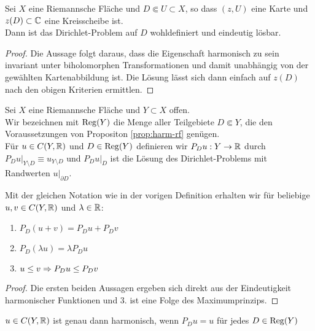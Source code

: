 \begin{prop}
  \label{prop:harm-rf}
  Sei $X$ eine Riemannsche Fläche und $D \Subset U \subset X$, so dass
  $(z, U)$ eine Karte und $z(D) \subset \mathbb{C}$ eine Kreisscheibe ist. \\
  Dann ist das Dirichlet-Problem auf $D$ wohldefiniert und eindeutig lösbar.
\end{prop}

\begin{proof}
  Die Aussage folgt daraus, dass die Eigenschaft harmonisch zu sein
  invariant unter biholomorphen Transformationen und damit unabhängig
  von der gewählten Kartenabbildung ist. Die Lösung lässt sich dann
  einfach auf $z(D)$ nach den obigen Kriterien ermittlen.
\end{proof}

\begin{defin}
  Sei $X$ eine Riemannsche Fläche und $Y \subset X$ offen. \\
  Wir bezeichnen mit $\operatorname{Reg}(Y)$ die Menge aller Teilgebiete $D \Subset
  Y$, die den Voraussetzungen von Propositon \ref{prop:harm-rf}
  genügen. \\
  Für $u \in C(Y, \mathbb{R})$ und $D \in \operatorname{Reg}(Y)$ definieren wir $P_D u: Y
  \rightarrow \mathbb{R}$ durch $P_D u |_{Y \setminus D} \equiv u_{Y \setminus D}$ und
  $P_Du|_D$ ist die Lösung des Dirichlet-Problems mit Randwerten
  $u|_{\partial D}$.
\end{defin}

\begin{cor}
  \label{cor:pd-rechenregeln}
  Mit der gleichen Notation wie in der vorigen Definition erhalten wir
  für beliebige $u, v\in C(Y, \mathbb{R})$ und $\lambda \in \mathbb{R}$:
  \begin{enumerate}
  \item $P_D(u+v) = P_Du + P_D v$
  \item $P_D(\lambda u) = \lambda P_D u$
  \item $u \leq v \Rightarrow P_Du \leq P_D v$
  \end{enumerate}
\end{cor}

\begin{proof}
  Die ersten beiden Aussagen ergeben sich direkt aus der Eindeutigkeit
  harmonischer Funktionen und 3. ist eine Folge des Maximumprinzips.
\end{proof}

\begin{cor}
  $u \in C(Y, \mathbb{R})$ ist genau dann harmonisch, wenn $P_Du = u $ für
  jedes $D \in \operatorname{Reg}(Y)$
\end{cor}

